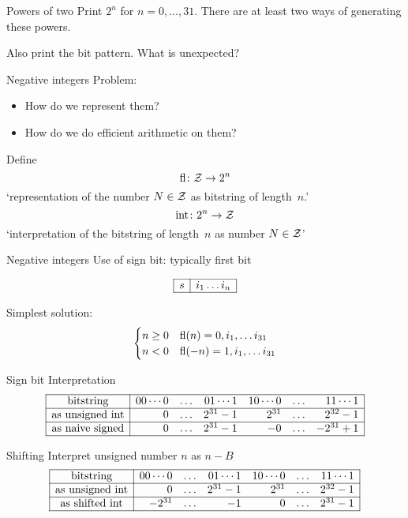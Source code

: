 \begin{exercise}{Powers of two}
  \label{ex:two-powers}
  Print $2^n$ for $n=0,\ldots,31$. There are at least two ways of
  generating these powers.

  Also print the bit pattern. What is unexpected?
\end{exercise}

\begin{numberedframe}{Negative integers}
  Problem:
  \begin{itemize}
  \item How do we represent them?
  \item How do we do efficient arithmetic on them?
  \end{itemize}
  Define
  \[ \mathop{\mathrm{fl}}\colon {\cal Z}\rightarrow 2^n \]
  `representation of the number $N\in{\cal Z}$ as bitstring of length~$n$.'
  \[ \mathop{\mathrm{int}}\colon 2^n \rightarrow {\cal Z} \]
  `interpretation of the bitstring of length~$n$ as number $N\in{\cal Z}$'
\end{numberedframe}

\begin{numberedframe}{Negative integers}
Use of sign bit: typically first bit

\[
\begin{array}{|r|r|}
  \hline
  s&i_1\ldots i_n\\ \hline
\end{array}
\]

Simplest solution:
\[
\begin{cases}
  n\geq 0&\mathop{\mathrm{fl}}(n)= 0,i_1,\ldots i_{31}\\
  n<0& \mathop{\mathrm{fl}}(-n)= 1,i_1,\ldots i_{31}
\end{cases}
\]
\end{numberedframe}

\begin{numberedframe}{Sign bit}
  Interpretation
  \[
\begin{array}{|c|rrrrrr|}
  \hline
  \hbox{bitstring}&
  00\cdots0&\ldots&01\cdots1&
  10\cdots0&\ldots&11\cdots1\\ \hline
  \hbox{as unsigned int}&
  0&\ldots&2^{31}-1&
  2^{31}&\ldots&2^{32}-1\\ \hline
  \hbox{as naive signed}&
  0&\ldots&2^{31}-1&
  -0&\ldots&-2^{31}+1\\ \hline
\end{array}
\]
\end{numberedframe}

\begin{numberedframe}{Shifting}
Interpret unsigned number $n$ as $n-B$
\[
\begin{array}{|c|rrrrrr|}
  \hline
  \hbox{bitstring}&
  00\cdots0&\ldots&01\cdots1&
  10\cdots0&\ldots&11\cdots1\\ \hline
  \hbox{as unsigned int}&
  0&\ldots&2^{31}-1&
  2^{31}&\ldots&2^{32}-1\\ \hline
  \hbox{as shifted int}&
  -2^{31}&\ldots&-1&
  0&\ldots&2^{31}-1\\ \hline
\end{array}
\]
\end{numberedframe}

